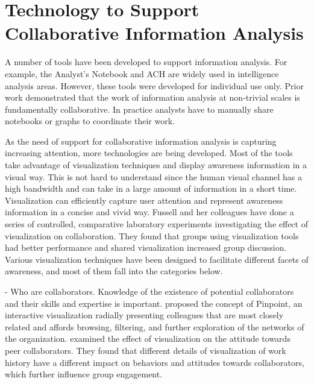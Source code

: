 \section{Technology to Support Collaborative Information Analysis}

A number of tools have been developed to support information analysis. For example, the Analyst’s Notebook \citep{IBM} and ACH \citep{PARC} are widely used in intelligence analysis areas. However, these tools were developed for individual use only. Prior work demonstrated that the work of information analysis at non-trivial scales is fundamentally collaborative. In practice analysts have to manually share notebooks or graphs to coordinate their work.

As the need of support for collaborative information analysis is capturing increasing attention, more technologies are being developed. Most of the tools take advantage of visualization techniques and display awareness information in a visual way. This is not hard to understand since the human visual channel has a high bandwidth and can take in a large amount of information in a short time. Visualization can efficiently capture user attention and represent awareness information in a concise and vivid way. Fussell and her colleagues \citep{Balakrishnan2010e,Goyal2013,Goyal2016} have done a series of controlled, comparative laboratory experiments investigating the effect of visualization on collaboration. They found that groups using visualization tools had better performance and shared visualization increased group discussion. Various visualization techniques have been designed to facilitate different facets of awareness, and most of them fall into the categories below. 

- Who are collaborators. Knowledge of the existence of potential collaborators and their skills and expertise is important. \cite{Forsen2009a} proposed the concept of Pinpoint, an interactive visualization radially presenting colleagues that are most closely related and affords browsing, filtering, and further exploration of the networks of the organization. \cite{Marlow2015a} examined the effect of visualization on the attitude towards peer collaborators. They found that different details of visualization of work history have a different impact on behaviors and attitudes towards collaborators, which further influence group engagement.
  
